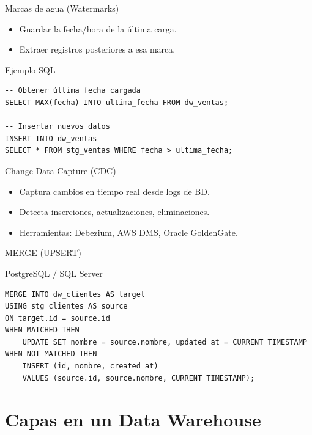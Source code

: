 \documentclass[aspectratio=169, 10pt, xcolor=table]{beamer}
\begin{document}
\begin{frame}{Marcas de agua (Watermarks)}
    \begin{itemize}
        \item Guardar la fecha/hora de la última carga.
        \item Extraer registros posteriores a esa marca.
    \end{itemize}
    \begin{block}{Ejemplo SQL}
        \begin{lstlisting}
-- Obtener última fecha cargada
SELECT MAX(fecha) INTO ultima_fecha FROM dw_ventas;

-- Insertar nuevos datos
INSERT INTO dw_ventas
SELECT * FROM stg_ventas WHERE fecha > ultima_fecha;
        \end{lstlisting}
    \end{block}
\end{frame}

\begin{frame}{Change Data Capture (CDC)}
    \begin{itemize}
        \item Captura cambios en tiempo real desde logs de BD.
        \item Detecta inserciones, actualizaciones, eliminaciones.
        \item Herramientas: Debezium, AWS DMS, Oracle GoldenGate.
    \end{itemize}
\end{frame}

\begin{frame}[fragile]{MERGE (UPSERT)}
    \begin{block}{PostgreSQL / SQL Server}
        \begin{lstlisting}
MERGE INTO dw_clientes AS target
USING stg_clientes AS source
ON target.id = source.id
WHEN MATCHED THEN
    UPDATE SET nombre = source.nombre, updated_at = CURRENT_TIMESTAMP
WHEN NOT MATCHED THEN
    INSERT (id, nombre, created_at)
    VALUES (source.id, source.nombre, CURRENT_TIMESTAMP);
        \end{lstlisting}
    \end{block}
\end{frame}

\section{Capas en un Data Warehouse}
\end{document}
